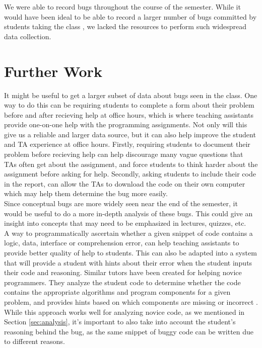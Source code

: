 \documentclass{sig-alternate}
\begin{document}
We were able to record \numtotal bugs throughout the course of the semester. While it would have been ideal to be able to record a larger number of bugs committed by students taking the class \cite{BryceCooleyHansenHayrapetyan10}, we lacked the resources to perform such widespread data collection.

\section{Further Work}
It might be useful to get a larger subset of data about bugs seen in the class. One way to do this can be requiring students to complete a form about their problem before and after recieving help at office hours, which is where teaching assistants provide one-on-one help with the programming assignments. Not only will this give us a reliable and larger data source, but it can also help improve the student and TA experience at office hours. Firstly, requiring students to document their problem before recieving help can help discourage many vague questions that TAs often get about the assignment, and force students to think harder about the assignment before asking for help. Secondly, asking students to include their code in the report, can allow the TAs to download the code on their own computer which may help them determine the bug more easily.\\

Since conceptual bugs are more widely seen near the end of the semester, it would be useful to do a more in-depth analysis of these bugs. This could give an insight into concepts that may need to be emphasized in lectures, quizzes, etc.\\

A way to programmatically ascertain whether a given snippet of code contains a logic, data, interface or comprehension error, can help teaching assistants to provide better quality of help to students. This can also be adapted into a system that will provide a student with hints about their error when the student inputs their code and reasoning. Similar tutors have been created for helping novice programmers. They analyze the student code to determine whether the code contains the appropriate algorithms and program components for a given problem, and provides hints based on which components are missing or incorrect \cite{Sudol-DeLyser14}. While this approach works well for analyzing novice code, as we mentioned in Section \ref{sec:analysis}, it's important to also take into account the student's reasoning behind the bug, as the same snippet of buggy code can be written due to different reasons.\\
\end{document}
